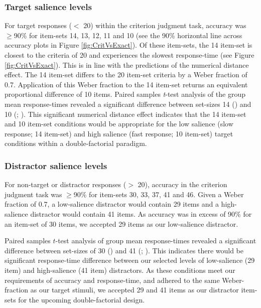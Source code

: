 \subsubsection{Target salience levels}
For target responses ($<$ 20) within the criterion judgment task, accuracy was $\geq$90\% for item-sets 14, 13, 12, 11 and 10 (see the 90\% horizontal line across accuracy plots in Figure \ref{fig:CritVsExact}). Of these item-sets, the 14 item-set is closest to the criteria of 20 and experiences the slowest response-time (see Figure \ref{fig:CritVsExact}). This is in line with the predictions of the numerical distance effect. The 14 item-set differs to the 20 item-set criteria by a Weber fraction of 0.7. Application of this Weber fraction to the 14 item-set returns an equivalent proportional difference of 10 items. Paired samples \textit{t}-test analysis of the group mean response-times revealed a significant difference between set-sizes 14 () and 10 (; ). This significant numerical distance effect indicates that the 14 item-set and 10 item-set conditions would be appropriate for the low salience (\ie slow response; 14 item-set) and high salience (\ie fast response; 10 item-set) target conditions within a double-factorial paradigm. 

\subsubsection{Distractor salience levels}
For non-target or distractor responses ($>$ 20), accuracy in the criterion judgment task was $\geq$90\% for item-sets 30, 33, 37, 41 and 46. Given a Weber fraction of 0.7, a low-salience distractor would contain 29 items and a high-salience distractor would contain 41 items. As accuracy was in excess of 90\% for an item-set of 30 items, we accepted 29 items as our low-salience distractor.

Paired samples $t$-test analysis of group mean response-times revealed a significant difference between set-sizes of 30 () and 41 (; ). This indicates there would be significant response-time difference between our selected levels of low-salience (29 item) and high-salience (41 item) distractors. As these conditions meet our requirements of accuracy and response-time, and adhered to the same Weber-fraction as our target stimuli, we accepted 29 and 41 items as our distractor item-sets for the upcoming double-factorial design.

\color{\Red}
